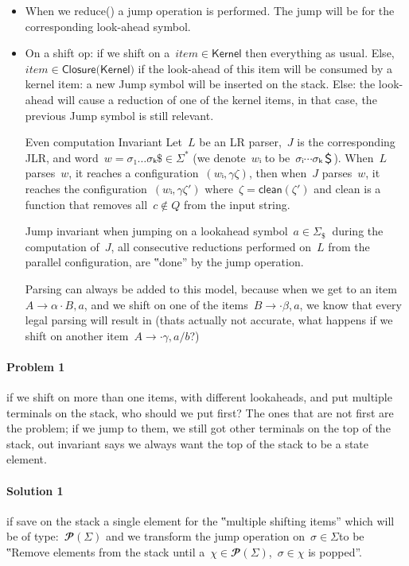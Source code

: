 \begin{itemize}
  \item When we \textsf{reduce()} a jump operation is performed.
    The jump will be for the corresponding look-ahead symbol.
  \item On a shift op:
  if we shift on a~$item∈\textsf{Kernel}$
    then everything as usual.
  Else,~$item∈\textsf{Closure(Kernel)}$
      if the look-ahead of this item will be consumed by a kernel item:
        a new Jump symbol will be inserted on the stack.
      Else:
        the look-ahead will cause a reduction of one of the kernel items,
        in that case, the previous Jump symbol is still relevant.
  \item[Even computation Invariant]
    Let~$L$ be an LR parser,~$J$ is the corresponding JLR, and word~$w=σ₁…σₖ\$∈Σ^*$ (we denote~$wᵢ$ to be~$σᵢ⋯σₖ ＄$).
    When~$L$ parses~$w$, it reaches a configuration~$(wᵢ,γζ)$,
    then when~$J$ parses~$w$, it reaches the configuration~$(wᵢ,γζ')$ where~$ζ= \textsf{clean}(ζ')$
    and \textsf{clean} is a function that removes all~$c∉Q$ from the input string.
  \item[Jump invariant]
    when jumping on a lookahead symbol~$a∈Σ_\$~$ during the computation of~$J$,
    all consecutive reductions performed on~$L$ from the parallel configuration, are ‟done” by the \textsf{jump} operation.
  \item[Parsing] can always be added to this model, because when we get to an item~$A→α·B,a$, and we shift on
    one of the items~$B→·β,a$, we know that every legal parsing will result in (thats actually not accurate, what happens
    if we shift on another item~$A→·γ,a/b$?)
\end{itemize}
\paragraph{Problem 1} if we shift on more than one items, with different lookaheads,
  and put multiple terminals on the stack, who should we put first? The ones that are
  not first are the problem; if we jump to them, we still got other terminals on the
  top of the stack, out invariant says we always want the top of the stack to be a
  state element.

\paragraph{Solution 1} if save on the stack a single element for the
  ‟multiple shifting items” which will be of type:~$𝓟(Σ)$
  and we transform the jump operation on~$σ∈Σ$to be ‟Remove elements
  from the stack until a~$χ∈𝓟(Σ)$,~$σ∈χ$ is popped”.

